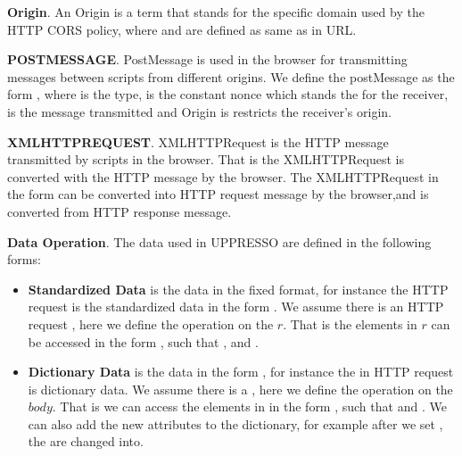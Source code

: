 \begin{appendices}
\vspace{1mm}\noindent\textbf{Origin}. 
An Origin is a term  that stands for the specific domain used by the HTTP CORS policy, where  and  are defined as same as in URL.

\vspace{1mm}\noindent\textbf{POSTMESSAGE}.
PostMessage is used in the browser for transmitting messages between scripts from different origins. We define the postMessage as the form , where  is the type,  is the constant nonce which stands the for the receiver,  is the message transmitted and Origin is restricts the receiver's origin.

\vspace{1mm}\noindent\textbf{XMLHTTPREQUEST}. 
XMLHTTPRequest is the HTTP message transmitted  by scripts in the browser. That is the XMLHTTPRequest is converted with the HTTP message by the browser. The XMLHTTPRequest in the form  can be converted into HTTP request message by the browser,and   is converted from HTTP response message.

\vspace{1mm}\noindent\textbf{Data Operation}. 
The data used in UPPRESSO are defined in the following forms:
\begin{itemize}
\item \textbf{Standardized Data} is the data in the fixed format, for instance the HTTP request is the standardized data in the form .  We assume there is an HTTP request , here we define the operation on the $r$. That is the elements in $r$ can be accessed in the form , such that ,   and . 
\item \textbf{Dictionary Data} is the data in the form , for instance the  in HTTP request is dictionary data. We assume there is a , here we define the operation on the $body$. That is we can access the elements in  in the form , such that  and . We can also add the new attributes to the dictionary, for example after we set , the  are changed into.
\end{itemize}


\end{appendices}

